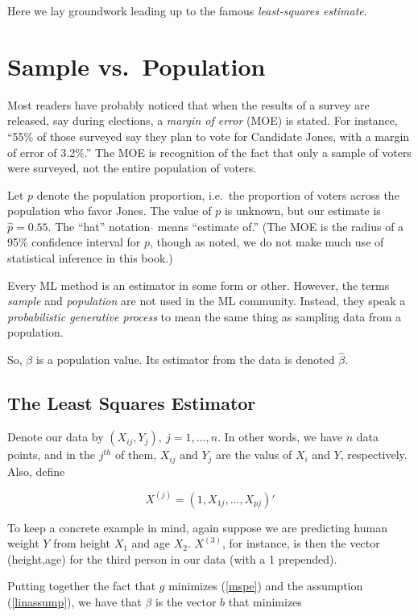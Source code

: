 Here we lay groundwork leading up to the famous \textit{least-squares
estimate}.

\section{Sample vs.\ Population}

Most readers have probably noticed that when the results of a survey are
released, say during elections, a \textit{margin of error} (MOE) is stated.
For instance, ``55\% of those surveyed say they plan to vote for
Candidate Jones, with a margin of error of 3.2\%.''  The MOE is
recognition of the fact that only a sample of voters were surveyed, not
the entire population of voters.

Let $p$ denote the population proportion, i.e.\ the proportion of voters
across the population who favor Jones.  The value of $p$ is unknown, but
our estimate is $\widehat{p} = 0.55$.  The ``hat'' notation $\widehat{}$
means ``estimate of.''  (The MOE is the radius of a 95\% confidence
interval for $p$, though as noted, we do not make much use of statistical
inference in this book.)

Every ML method is an estimator in some form or other.  However, the
terms \textit{sample} and \textit{population} are not used in the ML
community.  Instead, they speak a \textit{probabilistic generative
process} to mean the same thing as sampling data from a population.

So, $\beta$ is a population value.  Its estimator from the data is
denoted $\widehat{\beta}$.

\subsection{The Least Squares Estimator}

Denote our data by $(X_{ij},Y_j), ~ j = 1,...,n$.  In other words, we
have $n$ data points, and in the $j^{th}$ of them, $X_{ij}$ and $Y_j$
are the valus of $X_i$ and $Y$, respectively.  Also, define

\begin{equation}
X^{(j)} = (1,X_{1j},...,X_{pj})'
\end{equation}

To keep a concrete example in mind, again suppose we are predicting
human weight $Y$ from height $X_1$ and age $X_2$.  $X^{(3)}$, for
instance, is then the vector (height,age) for the third person in our
data (with a 1 prepended).

Putting together the fact that $g$ minimizes (\ref{mspe}) and the
assumption (\ref{linassump}), we have that $\beta$ is the vector $b$ 
that minimizes

